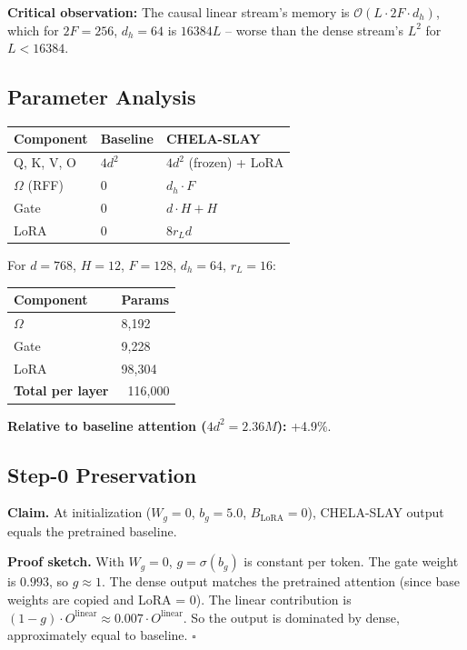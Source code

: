 \textbf{Critical observation:} The causal linear stream's memory is 
$\mathcal{O}(L \cdot 2F \cdot d_h)$, which for $2F = 256$, $d_h = 64$ is 
$16384 L$ -- worse than the dense stream's $L^2$ for $L < 16384$.

\subsection{Parameter Analysis}

\begin{table}[H]
\centering
\small
\begin{tabular}{lll}
\toprule
\textbf{Component} & \textbf{Baseline} & \textbf{CHELA-SLAY} \\
\midrule
Q, K, V, O & $4 d^2$ & $4 d^2$ (frozen) + LoRA \\
$\Omega$ (RFF) & 0 & $d_h \cdot F$ \\
Gate & 0 & $d \cdot H + H$ \\
LoRA & 0 & $8 r_L d$ \\
\bottomrule
\end{tabular}
\end{table}

For $d = 768$, $H = 12$, $F = 128$, $d_h = 64$, $r_L = 16$:

\begin{table}[H]
\centering
\small
\begin{tabular}{ll}
\toprule
\textbf{Component} & \textbf{Params} \\
\midrule
$\Omega$ & 8,192 \\
Gate & 9,228 \\
LoRA & 98,304 \\
\textbf{Total per layer} & ~116,000 \\
\bottomrule
\end{tabular}
\end{table}

\textbf{Relative to baseline attention ($4 d^2 = 2.36M$):} +4.9\%.

\subsection{Step-0 Preservation}

\textbf{Claim.} At initialization ($W_g = 0$, $b_g = 5.0$, 
$B_\text{LoRA} = 0$), CHELA-SLAY output equals the pretrained baseline.

\textbf{Proof sketch.} With $W_g = 0$, $g = \sigma(b_g)$ is constant per token. 
The gate weight is $0.993$, so $g \approx 1$. The dense output 
matches the pretrained attention (since base weights are copied and 
LoRA = 0). The linear contribution is $(1 - g) \cdot O^\text{linear} 
\approx 0.007 \cdot O^\text{linear}$. So the output is dominated by dense, 
approximately equal to baseline. $\square$


